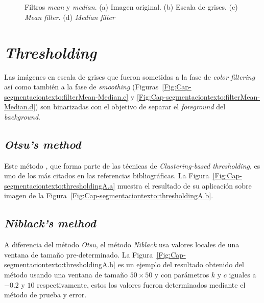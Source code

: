 \begin{figure}[h!]
	\centering
   { }
   \\
   { }
   \\
  \caption[Filtros \textit{mean} y \textit{median}]{Filtros \textit{mean} y 
  \textit{median}. (a) Imagen original. (b) Escala de grises. (c) \textit{Mean
filter}. (d) \textit{Median filter}}
	\label{Fig:Cap-segmentaciontexto:filterMean-Median}
\end{figure}

\section{\textit{Thresholding}}
Las imágenes en escala de grises que fueron sometidas a la fase de 
\textit{color filtering} así como también a la fase de \textit{smoothing}
(Figuras~\ref{Fig:Cap-segmentaciontexto:filterMean-Median.c} y
\ref{Fig:Cap-segmentaciontexto:filterMean-Median.d}) son binarizadas con el
objetivo de separar el \textit{foreground} del \textit{background}.

\subsection{\textit{Otsu's method}}
Este método \cite{Otsu:1979:Threshold}, que forma parte de las técnicas de \textit{Clustering-based 
thresholding}, es uno de los más citados en las referencias bibliográficas. La
Figura~\ref{Fig:Cap-segmentaciontexto:thresholdingA.a} muestra el resultado de
su aplicación sobre imagen de la
Figura~\ref{Fig:Cap-segmentaciontexto:thresholdingA.b}.

\subsection{\textit{Niblack's method}}
A diferencia del método \textit{Otsu}, el método \textit{Niblack}
\cite{Niblack:1985:IDI} usa valores
locales de una ventana de tamaño pre-determinado. La
Figura~\ref{Fig:Cap-segmentaciontexto:thresholdingA.b} es un ejemplo del
resultado obtenido del método usando una ventana de tamaño $50 \times 50$ y con
parámetros $k$ y $c$ iguales a $-0.2$ y $10$ respectivamente, estos los valores
fueron determinados mediante el método de prueba y error.

